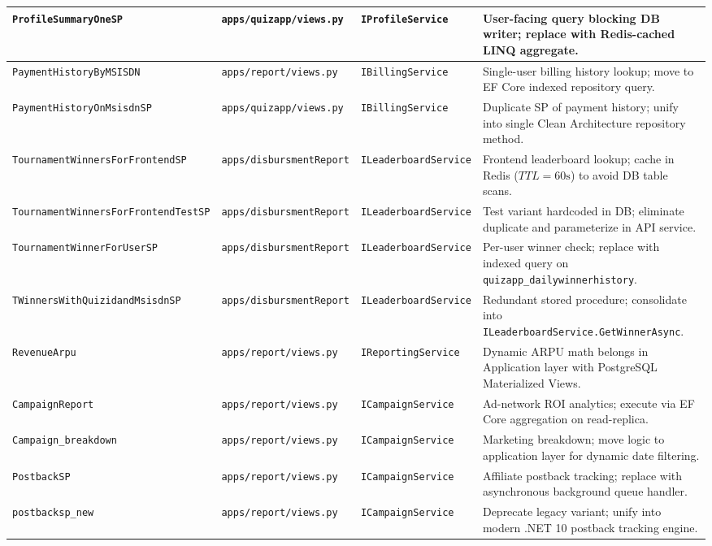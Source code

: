 {\begin{longtable}{|p{3.8cm}|p{3.2cm}|p{3.5cm}|p{3.5cm}|}
\texttt{ProfileSummaryOneSP} & \texttt{apps/quizapp/views.py} & \texttt{IProfileService} & User-facing query blocking DB writer; replace with Redis-cached LINQ aggregate. \\ \hline
\texttt{PaymentHistoryByMSISDN} & \texttt{apps/report/views.py} & \texttt{IBillingService} & Single-user billing history lookup; move to EF Core indexed repository query. \\ \hline
\texttt{PaymentHistoryOnMsisdnSP} & \texttt{apps/quizapp/views.py} & \texttt{IBillingService} & Duplicate SP of payment history; unify into single Clean Architecture repository method. \\ \hline
\texttt{TournamentWinnersForFrontendSP} & \texttt{apps/disbursmentReport} & \texttt{ILeaderboardService} & Frontend leaderboard lookup; cache in Redis ($TTL=60\text{s}$) to avoid DB table scans. \\ \hline
\texttt{TournamentWinnersForFrontendTestSP} & \texttt{apps/disbursmentReport} & \texttt{ILeaderboardService} & Test variant hardcoded in DB; eliminate duplicate and parameterize in API service. \\ \hline
\texttt{TournamentWinnerForUserSP} & \texttt{apps/disbursmentReport} & \texttt{ILeaderboardService} & Per-user winner check; replace with indexed query on \texttt{quizapp\_dailywinnerhistory}. \\ \hline
\texttt{TWinnersWithQuizidandMsisdnSP} & \texttt{apps/disbursmentReport} & \texttt{ILeaderboardService} & Redundant stored procedure; consolidate into \texttt{ILeaderboardService.GetWinnerAsync}. \\ \hline
\texttt{RevenueArpu} & \texttt{apps/report/views.py} & \texttt{IReportingService} & Dynamic ARPU math belongs in Application layer with PostgreSQL Materialized Views. \\ \hline
\texttt{CampaignReport} & \texttt{apps/report/views.py} & \texttt{ICampaignService} & Ad-network ROI analytics; execute via EF Core aggregation on read-replica. \\ \hline
\texttt{Campaign\_breakdown} & \texttt{apps/report/views.py} & \texttt{ICampaignService} & Marketing breakdown; move logic to application layer for dynamic date filtering. \\ \hline
\texttt{PostbackSP} & \texttt{apps/report/views.py} & \texttt{ICampaignService} & Affiliate postback tracking; replace with asynchronous background queue handler. \\ \hline
\texttt{postbacksp\_new} & \texttt{apps/report/views.py} & \texttt{ICampaignService} & Deprecate legacy variant; unify into modern .NET 10 postback tracking engine. \\ \hline

\end{longtable}}
